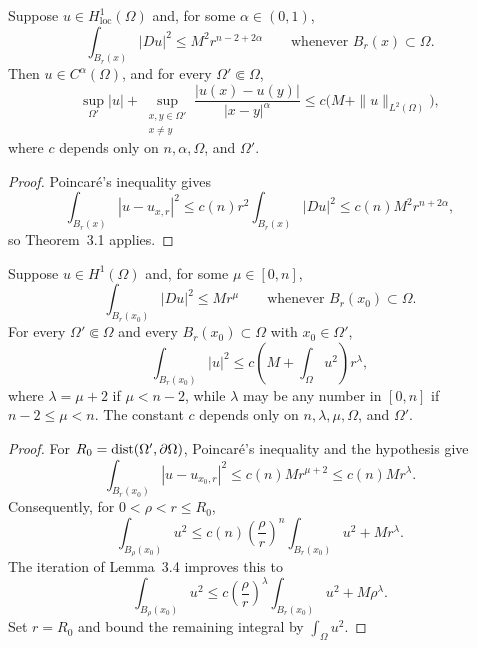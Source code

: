 \begin{corollary}\label{hanlin:weaksol-part1-morrey}
Suppose $u\in H^1_{\mathrm{loc}}(\Omega)$ and, for some
$\alpha\in(0,1)$,
\[
\int_{B_r(x)}|Du|^2\leq M^2r^{n-2+2\alpha}
\qquad\text{whenever }B_r(x)\subset\Omega.
\]
Then $u\in C^\alpha(\Omega)$, and for every $\Omega'\Subset\Omega$,
\[
\sup_{\Omega'}|u|+
\sup_{\substack{x,y\in\Omega'\\x\ne y}}
\frac{|u(x)-u(y)|}{|x-y|^\alpha}
\leq c\bigl(M+\|u\|_{L^2(\Omega)}\bigr),
\]
where $c$ depends only on $n,\alpha,\Omega$, and $\Omega'$.
\end{corollary}
\begin{proof}
\sketch Poincar\'e's inequality gives
\[
\int_{B_r(x)}|u-u_{x,r}|^2
\leq c(n)r^2\int_{B_r(x)}|Du|^2
\leq c(n)M^2r^{n+2\alpha},
\]
so Theorem~3.1 applies.
\end{proof}

\begin{lemma}\label{hanlin:weaksol-part1-lemma-3-3}
Suppose $u\in H^1(\Omega)$ and, for some $\mu\in[0,n]$,
\[
\int_{B_r(x_0)}|Du|^2\leq Mr^\mu
\qquad\text{whenever }B_r(x_0)\subset\Omega.
\]
For every $\Omega'\Subset\Omega$ and every $B_r(x_0)\subset\Omega$ with
$x_0\in\Omega'$,
\[
\int_{B_r(x_0)}|u|^2
\leq c\left(M+\int_\Omega u^2\right)r^\lambda,
\]
where $\lambda=\mu+2$ if $\mu<n-2$, while $\lambda$ may be any number
in $[0,n]$ if $n-2\leq\mu<n$. The constant $c$ depends only on
$n,\lambda,\mu,\Omega$, and $\Omega'$.
\end{lemma}
\begin{proof}
\sketch For $R_0=\operatorname{dist}(\Omega',\partial\Omega)$, Poincar\'e's inequality
and the hypothesis give
\[
\int_{B_r(x_0)}|u-u_{x_0,r}|^2\leq c(n)Mr^{\mu+2}\leq c(n)Mr^\lambda.
\]
Consequently, for $0<\rho<r\leq R_0$,
\[
\int_{B_\rho(x_0)}u^2
\leq c(n)\left(\frac{\rho}{r}\right)^n
\int_{B_r(x_0)}u^2+Mr^\lambda.
\]
The iteration of Lemma~3.4 improves this to
\[
\int_{B_\rho(x_0)}u^2
\leq c\left(\frac{\rho}{r}\right)^\lambda
\int_{B_r(x_0)}u^2+M\rho^\lambda.
\]
Set $r=R_0$ and bound the remaining integral by $\int_\Omega u^2$.
\end{proof}

